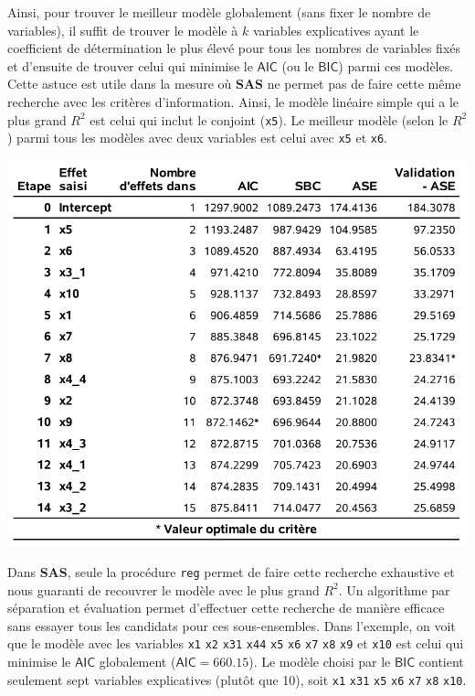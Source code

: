 \documentclass[
  11pt,
  letterpaper,
]{book}
\theoremstyle{definition}
\theoremstyle{definition}
\theoremstyle{definition}
\theoremstyle{definition}
\theoremstyle{remark}
\begin{document}
Ainsi, pour trouver le meilleur modèle globalement (sans fixer le nombre de variables), il suffit de trouver le modèle à \(k\) variables explicatives ayant le coefficient de détermination le plus élevé pour tous les nombres de variables fixés et d'ensuite de trouver celui qui minimise le \(\mathsf{AIC}\) (ou le \(\mathsf{BIC}\)) parmi ces modèles. Cette astuce est utile dans la mesure où \textbf{SAS} ne permet pas de faire cette même recherche avec les critères d'information. Ainsi, le modèle linéaire simple qui a le plus grand \(R^2\) est celui qui inclut le conjoint (\texttt{x5}). Le meilleur modèle (selon le \(R^2\)) parmi tous les modèles avec deux variables est celui avec \texttt{x5} et \texttt{x6}.

\begin{center}\includegraphics[width=0.9\linewidth]{figures/02-select-e7} \end{center}

Dans \textbf{SAS}, seule la procédure \texttt{reg} permet de faire cette recherche exhaustive et nous guaranti de recouvrer le modèle avec le plus grand \(R^2\). Un algorithme par séparation et évaluation permet d'effectuer cette recherche de manière efficace sans essayer tous les candidats pour ces sous-ensembles. Dans l'exemple, on voit que le modèle avec les variables \texttt{x1} \texttt{x2} \texttt{x31} \texttt{x44} \texttt{x5} \texttt{x6} \texttt{x7} \texttt{x8} \texttt{x9} et \texttt{x10} est celui qui minimise le \(\mathsf{AIC}\) globalement (\(\mathsf{AIC}=660.15\)). Le modèle choisi par le \(\mathsf{BIC}\) contient seulement sept variables explicatives (plutôt que 10), soit \texttt{x1} \texttt{x31} \texttt{x5} \texttt{x6} \texttt{x7} \texttt{x8} \texttt{x10}.
\end{document}
